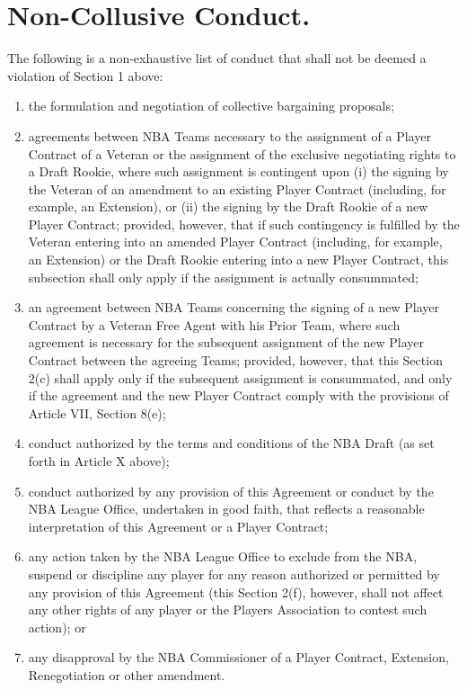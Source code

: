 \documentclass[
]{book}
\providecommand{\tightlist}{%
  \setlength{\itemsep}{0pt}\setlength{\parskip}{0pt}}
\begin{document}
\hypertarget{non-collusive-conduct.}{%
\section{Non-Collusive Conduct.}\label{non-collusive-conduct.}}

The following is a non-exhaustive list of conduct that shall not be deemed a violation of Section 1 above:

\begin{enumerate}
\def\labelenumi{(\alph{enumi})}
\tightlist
\item
  the formulation and negotiation of collective bargaining proposals;
\item
  agreements between NBA Teams necessary to the assignment of a Player Contract of a Veteran or the assignment of the exclusive negotiating rights to a Draft Rookie, where such assignment is contingent upon (i) the signing by the Veteran of an amendment to an existing Player Contract (including, for example, an Extension), or (ii) the signing by the Draft Rookie of a new Player Contract; provided, however, that if such contingency is fulfilled by the Veteran entering into an amended Player Contract (including, for example, an Extension) or the Draft Rookie entering into a new Player Contract, this subsection shall only apply if the assignment is actually consummated;
\item
  an agreement between NBA Teams concerning the signing of a new Player Contract by a Veteran Free Agent with his Prior Team, where such agreement is necessary for the subsequent assignment of the new Player Contract between the agreeing Teams; provided, however, that this Section 2(c) shall apply only if the subsequent assignment is consummated, and only if the agreement and the new Player Contract comply with the provisions of Article VII, Section 8(e);
\item
  conduct authorized by the terms and conditions of the NBA Draft (as set forth in Article X above);
\item
  conduct authorized by any provision of this Agreement or conduct by the NBA League Office, undertaken in good faith, that reflects a reasonable interpretation of this Agreement or a Player Contract;
\item
  any action taken by the NBA League Office to exclude from the NBA, suspend or discipline any player for any reason authorized or permitted by any provision of this Agreement (this Section 2(f), however, shall not affect any other rights of any player or the Players Association to contest such action); or
\item
  any disapproval by the NBA Commissioner of a Player Contract, Extension, Renegotiation or other amendment.
\end{enumerate}
\end{document}
